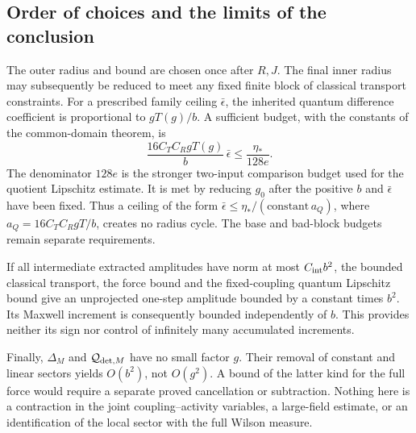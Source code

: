 \subsection{Order of choices and the limits of the conclusion}
\label{zif-scope-section}

The outer radius and bound are chosen once after $R,J$.
The final inner radius may subsequently be reduced to meet
any fixed finite block of classical transport constraints.
For a prescribed family ceiling $\bar\epsilon$, the inherited
quantum difference coefficient is proportional to $gT(g)/b$.
A sufficient budget, with the constants of the common-domain
theorem, is
\begin{equation}
 \frac{16C_TC_RgT(g)}b\,\bar\epsilon
       \le\frac{\eta_*}{128e}.
 \label{zif-inherited-budget}
\end{equation}
The denominator $128e$ is the stronger two-input comparison
budget used for the quotient Lipschitz estimate. It is met by
reducing $g_0$ after the positive $b$ and
$\bar\epsilon$ have been fixed. Thus a ceiling of the form
$\bar\epsilon\le\eta_*/(\text{constant}\,a_Q)$,
where $a_Q=16C_TC_RgT/b$, creates no radius cycle.
The base and bad-block budgets remain separate requirements.

If all intermediate extracted amplitudes have norm at most
$C_{\rm int}b^2$, the bounded classical transport, the force
bound and the fixed-coupling quantum Lipschitz bound give
an unprojected one-step amplitude bounded by a constant
times $b^2$. Its Maxwell increment is consequently bounded
independently of $b$. This provides neither its sign nor
control of infinitely many accumulated increments.

Finally, $\Delta_M$ and $\mathcal Q_{{\rm det},M}$ have
no small factor $g$. Their removal of constant and linear
sectors yields $O(b^2)$, not $O(g^2)$. A bound of the latter
kind for the full force would require a separate proved
cancellation or subtraction. Nothing here is a contraction
in the joint coupling--activity variables, a large-field
estimate, or an identification of the local sector with the
full Wilson measure.
